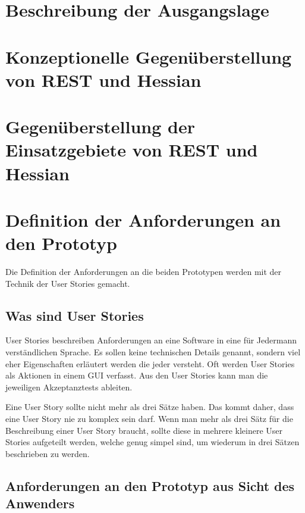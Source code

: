 \documentclass[listof=totocnumbered, bibliography=totocnumbered]{scrreprt}
\begin{document}
  
  \section{Beschreibung der Ausgangslage}
  
  
  \newpage
  
  \section{Konzeptionelle Gegenüberstellung von REST und Hessian}
  
  
  \newpage
  
  \section{Gegenüberstellung der Einsatzgebiete von REST und Hessian}
  
  
  \newpage
  
  \section{Definition der Anforderungen an den Prototyp}
  
  Die Definition der Anforderungen an die beiden Prototypen werden mit der
  Technik der User Stories\cite{UserStories} gemacht.
  
  \subsection{Was sind User Stories}
  
  User Stories beschreiben Anforderungen an eine Software in eine für Jedermann
  verständlichen Sprache. Es sollen keine technischen Details genannt, sondern
  viel eher Eigenschaften erläutert werden die jeder versteht. Oft werden User
  Stories als Aktionen in einem \ac{GUI} verfasst. Aus den User Stories kann
  man die jeweiligen Akzeptanztests\cite{AcceptanceTests} ableiten.
  
  Eine User Story sollte nicht mehr als drei Sätze haben. Das kommt daher, dass
  eine User Story nie zu komplex sein darf. Wenn man mehr als drei Sätz für die
  Beschreibung einer User Story braucht, sollte diese in mehrere kleinere User
  Stories aufgeteilt werden, welche genug simpel sind, um wiederum in drei
  Sätzen beschrieben zu werden.
  
  \subsection{Anforderungen an den Prototyp aus Sicht des Anwenders}
  
\end{document}

